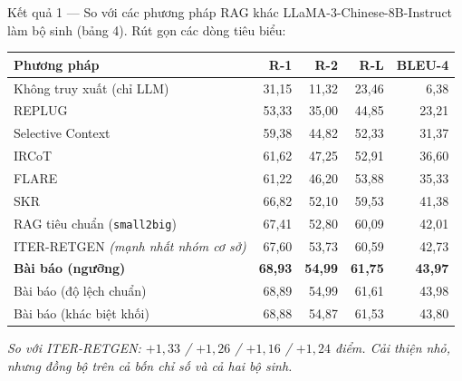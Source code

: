 \documentclass[aspectratio=169,10pt]{beamer}
\begin{document}
\begin{frame}{Kết quả 1 --- So với các phương pháp RAG khác}
  {\small LLaMA-3-Chinese-8B-Instruct làm bộ sinh (bảng 4). Rút gọn các dòng tiêu biểu:}
  \begin{center}
  \scriptsize
  \setlength{\aboverulesep}{0.3ex}\setlength{\belowrulesep}{0.3ex}
  \begin{tabular}{lrrrr}
    \toprule
    \textbf{Phương pháp} & \textbf{R-1} & \textbf{R-2} & \textbf{R-L} & \textbf{BLEU-4} \\
    \midrule
    Không truy xuất (chỉ LLM) & 31{,}15 & 11{,}32 & 23{,}46 & 6{,}38 \\
    REPLUG & 53{,}33 & 35{,}00 & 44{,}85 & 23{,}21 \\
    Selective Context & 59{,}38 & 44{,}82 & 52{,}33 & 31{,}37 \\
    IRCoT & 61{,}62 & 47{,}25 & 52{,}91 & 36{,}60 \\
    FLARE & 61{,}22 & 46{,}20 & 53{,}88 & 35{,}33 \\
    SKR & 66{,}82 & 52{,}10 & 59{,}53 & 41{,}38 \\
    RAG tiêu chuẩn (\texttt{small2big}) & 67{,}41 & 52{,}80 & 60{,}09 & 42{,}01 \\
    ITER-RETGEN \emph{(mạnh nhất nhóm cơ sở)} & 67{,}60 & 53{,}73 & 60{,}59 & 42{,}73 \\
    \midrule
    \textbf{Bài báo (ngưỡng)} & \textbf{68{,}93} & \textbf{54{,}99} & \textbf{61{,}75} & \textbf{43{,}97} \\
    Bài báo (độ lệch chuẩn) & 68{,}89 & 54{,}99 & 61{,}61 & 43{,}98 \\
    Bài báo (khác biệt khối) & 68{,}88 & 54{,}87 & 61{,}53 & 43{,}80 \\
    \bottomrule
  \end{tabular}
  \end{center}
  {\footnotesize\itshape So với ITER-RETGEN: $+1{,}33$ / $+1{,}26$ / $+1{,}16$ / $+1{,}24$ điểm.
  Cải thiện nhỏ, nhưng đồng bộ trên cả bốn chỉ số và cả hai bộ sinh.}
\end{frame}
\end{document}
